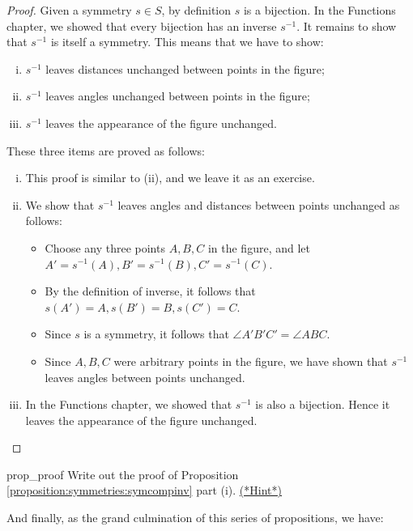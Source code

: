 \begin{proof}
Given a symmetry $s \in S$, by definition $s$ is a bijection.  In the Functions chapter, we showed that every bijection has an inverse $s^{-1}$. It remains to show that $s^{-1}$ is itself a symmetry. This means that we have to show: 

\begin{enumerate}[(i)]
\item
 $s^{-1}$ leaves distances unchanged between points in the figure;  
\item
$s^{-1}$ leaves angles unchanged between points in the figure; 
\item
$s^{-1}$ leaves the appearance of the figure unchanged.  
\end{enumerate}

\noindent  These three items are proved as follows:

\begin{enumerate}[(i)]
\item
This proof is similar to (ii), and we leave it as an exercise.
\item
We show that $s^{-1}$ leaves angles and distances between points unchanged as follows:
\begin{itemize}
\item
 Choose any three points $A, B, C$ in the figure, and let $A'=s^{-1}(A), B'=s^{-1}(B),  C'=s^{-1}(C)$. 
\item
By the definition of inverse, it follows that 
$s(A')=A, s(B')=B, s(C')=C$. 
\item
Since $s$ is a symmetry, it follows that $\angle A'B'C' =\angle ABC$.  
\item
Since $A,B, C$ were arbitrary points in the figure, we have shown 
that $s^{-1}$ leaves angles between points unchanged.
\end{itemize}
\item In the Functions chapter, we showed that $s^{-1}$ is also a bijection. Hence it leaves the appearance of the figure unchanged.
\end{enumerate} 
\end{proof}

\begin{exercise}{prop_proof}
Write out the proof of Proposition \ref{proposition:symmetries:symcompinv} part (i).
\hyperref[sec:symmetries:hints]{(*Hint*)}
\end{exercise}

And finally, as the grand culmination of this series of propositions, we have:

